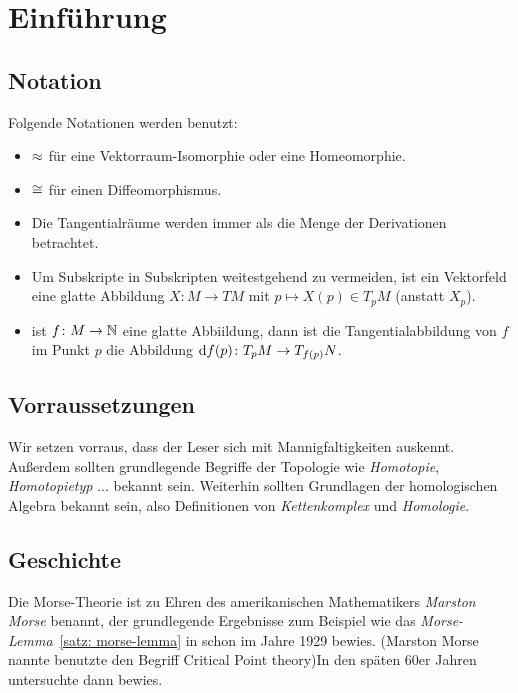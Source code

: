 \section{Einführung}

\subsection*{Notation}

Folgende Notationen werden benutzt:

\begin{itemize}
    \item $\approx$ für eine Vektorraum-Isomorphie oder eine Homeomorphie.
    \item $\cong$ für einen Diffeomorphismus.
    \item Die Tangentialräume werden immer als die Menge der Derivationen betrachtet.
    \item Um Subskripte in Subskripten weitestgehend zu vermeiden, ist ein Vektorfeld eine 
        glatte Abbildung $X \colon M \to TM$ mit $p \mapsto X(p) \in T_pM$ (anstatt $X_p$).
    \item ist $f \colon M \to { \mathbb N }$ eine glatte Abbiildung, dann ist die Tangentialabbildung
        von $f$ im Punkt $p$ die Abbildung ${ \operatorname{d} } f (p) \colon T_pM \to T_{f(p)}N$.
\end{itemize}

\subsection*{Vorraussetzungen}

Wir setzen vorraus, dass der Leser sich mit Mannigfaltigkeiten auskennt. Außerdem sollten 
grundlegende Begriffe der Topologie wie \textit{Homotopie}, \textit{Homotopietyp} ... 
bekannt sein. Weiterhin sollten Grundlagen der homologischen Algebra bekannt sein, also 
Definitionen von \textit{Kettenkomplex} und \textit{Homologie}.

\subsection*{Geschichte}

Die Morse-Theorie ist zu Ehren des amerikanischen Mathematikers \textit{Marston Morse} benannt, der
grundlegende Ergebnisse zum Beispiel wie das \textit{Morse-Lemma}~\ref{satz: morse-lemma} in 
\cite{morse} schon im Jahre 1929 bewies. (Marston Morse nannte benutzte den Begriff 
\glqq Critical Point theory\grqq{})In den späten 60er Jahren untersuchte dann 
bewies.
